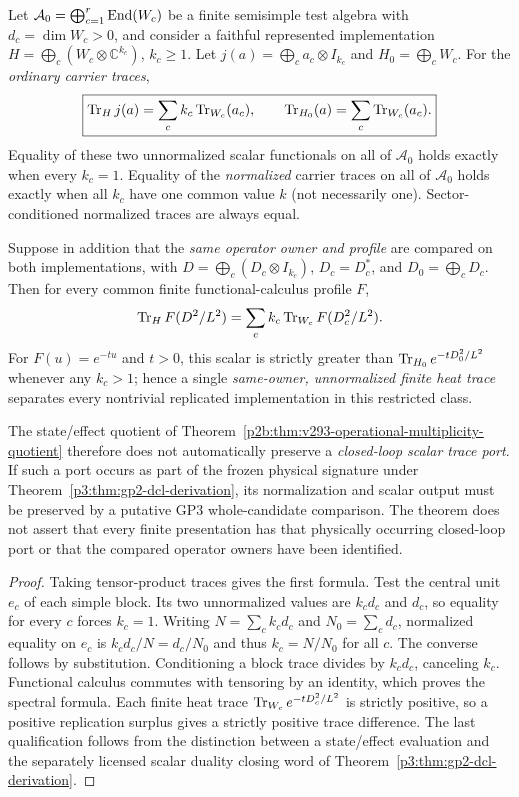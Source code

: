 \documentclass[12pt,a4paper]{article}
\begin{document}
\begin{theorem}
\label{p3b:thm:v295-trace-owner-multiplicity-firewall}
Let $\mathcal A_0=\bigoplus_{c=1}^r\operatorname{End}(W_c)$ be a finite
semisimple test algebra with $d_c=\dim W_c>0$, and consider a
faithful represented implementation
$H=\bigoplus_c(W_c\otimes\mathbb C^{k_c})$, $k_c\geq1$.
Let $j(a)=\bigoplus_c a_c\otimes I_{k_c}$ and
$H_0=\bigoplus_c W_c$.  For the \emph{ordinary carrier traces},
\[
 \boxed{\operatorname{Tr}_H j(a)=\sum_c k_c\operatorname{Tr}_{W_c}(a_c),\qquad
 \operatorname{Tr}_{H_0}(a)=\sum_c\operatorname{Tr}_{W_c}(a_c).}
\]
Equality of these two unnormalized scalar functionals on all of
$\mathcal A_0$ holds exactly when every $k_c=1$.  Equality of the
\emph{normalized} carrier traces on all of $\mathcal A_0$ holds exactly
when all $k_c$ have one common value $k$ (not necessarily one).
Sector-conditioned normalized traces are always equal.

Suppose in addition that the \emph{same operator owner and profile}
are compared on both implementations, with
$D=\bigoplus_c(D_c\otimes I_{k_c})$, $D_c=D_c^*$, and
$D_0=\bigoplus_cD_c$. Then for every common finite functional-calculus
profile $F$,
\[
 \operatorname{Tr}_H F(D^2/L^2)=\sum_c k_c\operatorname{Tr}_{W_c}F(D_c^2/L^2).
\]
For $F(u)=e^{-tu}$ and $t>0$, this scalar is strictly greater than
$\operatorname{Tr}_{H_0}e^{-tD_0^2/L^2}$ whenever any $k_c>1$; hence a single
\emph{same-owner, unnormalized finite heat trace} separates every
nontrivial replicated implementation in this restricted class.

The state/effect quotient of
Theorem~\ref{p2b:thm:v293-operational-multiplicity-quotient}
therefore does not automatically preserve a \emph{closed-loop scalar
trace port}.  If such a port occurs as part of the frozen physical
signature under Theorem~\ref{p3:thm:gp2-dcl-derivation}, its
normalization and scalar output must be preserved by a putative GP3
whole-candidate comparison.  The theorem does not assert that every
finite presentation has that physically occurring closed-loop port or
that the compared operator owners have been identified.
\end{theorem}
\begin{proof}
Taking tensor-product traces gives the first formula. Test the
central unit $e_c$ of each simple block.  Its two unnormalized values
are $k_cd_c$ and $d_c$, so equality for every $c$ forces $k_c=1$.
Writing $N=\sum_c k_cd_c$ and $N_0=\sum_cd_c$, normalized equality
on $e_c$ is $k_cd_c/N=d_c/N_0$ and thus
$k_c=N/N_0$ for all $c$. The converse follows by substitution.
Conditioning a block trace divides by $k_cd_c$, canceling $k_c$.
Functional calculus commutes with tensoring by an identity, which
proves the spectral formula. Each finite heat trace
$\operatorname{Tr}_{W_c}e^{-tD_c^2/L^2}$ is strictly positive, so a positive
replication surplus gives a strictly positive trace difference.
The last qualification follows from the distinction between a
state/effect evaluation and the separately licensed scalar duality
closing word of Theorem~\ref{p3:thm:gp2-dcl-derivation}.
\end{proof}
\end{document}
